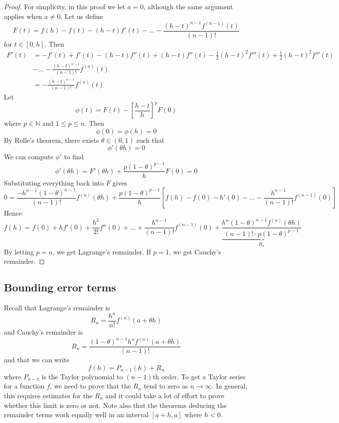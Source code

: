 \begin{proof}
	For simplicity, in this proof we let \(a = 0\), although the same argument applies when \(a \neq 0\).
	Let us define
	\[
		F(t) = f(h) - f(t) - (h-t)f'(t) - \dots - \frac{(h-t)^{n-1}f^{(n-1)}(t)}{(n-1)!}
	\]
	for \(t \in [0, h]\).
	Then
	\begin{align*}
		F'(t) & = -f'(t) + f'(t) - (h-t)f''(t) + (h-t)f''(t) - \frac{1}{2} (h-t)^2f'''(t) + \frac{1}{2} (h-t)^2f'''(t) \\
		      & - \dots - \frac{(h-t)^{n-1}}{(n-1)!}f^{(n)}(t)                                                         \\
		      & = - \frac{(h-t)^{n-1}}{(n-1)!}f^{(n)}(t)
	\end{align*}
	Let
	\[
		\phi(t) = F(t) - \left[ \frac{h-t}{h} \right]^p F(0)
	\]
	where \(p \in \mathbb N\) and \(1 \leq p \leq n\).
	Then
	\[
		\phi(0) = \phi(h) = 0
	\]
	By Rolle's theorem, there exists \(\theta \in (0, 1)\) such that
	\[
		\phi'(\theta h) = 0
	\]
	We can compute \(\phi'\) to find
	\[
		\phi'(\theta h) = F'(\theta h) + \frac{p(1-\theta)^{p-1}}{h} F(0) = 0
	\]
	Substituting everything back into \(F\) gives
	\[
		0 = \frac{-h^{n-1}(1-\theta)^{n-1}}{(n-1)!}f^{(n)}(\theta h) + \frac{p(1-\theta)^{p-1}}{h}\left[ f(h) - f(0) - h'(0) - \dots - \frac{h^{n-1}}{(n-1)!}f^{(n-1)}(0) \right]
	\]
	Hence
	\[
		f(h) = f(0) + hf'(0) + \frac{h^2}{2!} f''(0) + \dots + \frac{h^{n-1}}{(n-1)!}f^{(n-1)}(0) + \underbrace{\frac{h^n(1 - \theta)^{n-1}f^{(n)}(\theta h)}{(n-1)!\cdot p(1-\theta)^{p-1}}}_{R_n}
	\]
	By letting \(p = n\), we get Lagrange's remainder.
	If \(p=1\), we get Cauchy's remainder.
\end{proof}

\subsection{Bounding error terms}
Recall that Lagrange's remainder is
\[
	R_n = \frac{h^n}{n!}f^{(n)}(a + \theta h)
\]
and Cauchy's remainder is
\[
	R_n = \frac{(1 - \theta)^{n-1}h^n f^{(n)}(a + \theta h)}{(n-1)!}
\]
and that we can write
\[
	f(h) = P_{n-1}(h) + R_n
\]
where \(P_{n-1}\) is the Taylor polynomial to \((n-1)\)th order.
To get a Taylor series for a function \(f\), we need to prove that the \(R_n\) tend to zero as \(n \to \infty\).
In general, this requires estimates for the \(R_n\) and it could take a lot of effort to prove whether this limit is zero or not.
Note also that the theorems deducing the remainder terms work equally well in an interval \([a+h, a]\) where \(h < 0\).

